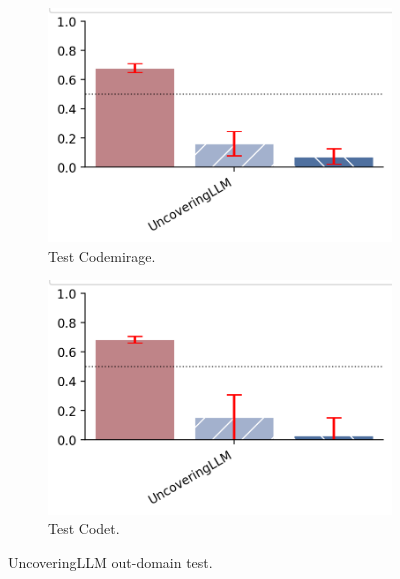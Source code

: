 \begin{figure}[H]
    \centering
    \begin{subfigure}[b]{0.45\textwidth}
        \centering
        \includegraphics[width=\linewidth]{img/TEST/UncovernngLLM/Clearcode/ccffd05754577a21cc6a59268a66bfd331e7843ede30c92a0f3a8403.png}
        \caption{Test Codemirage.}
        \label{fig:7}
    \end{subfigure}
    \hfill
    \begin{subfigure}[b]{0.45\textwidth}
        \centering
        \includegraphics[width=\linewidth]{img/tests/UncoveringLLM/teststandard.png}
        \caption{Test Codet.}
        \label{fig:8}
    \end{subfigure}
    \caption{UncoveringLLM out-domain test.}
    \label{fig:333}
\end{figure}

